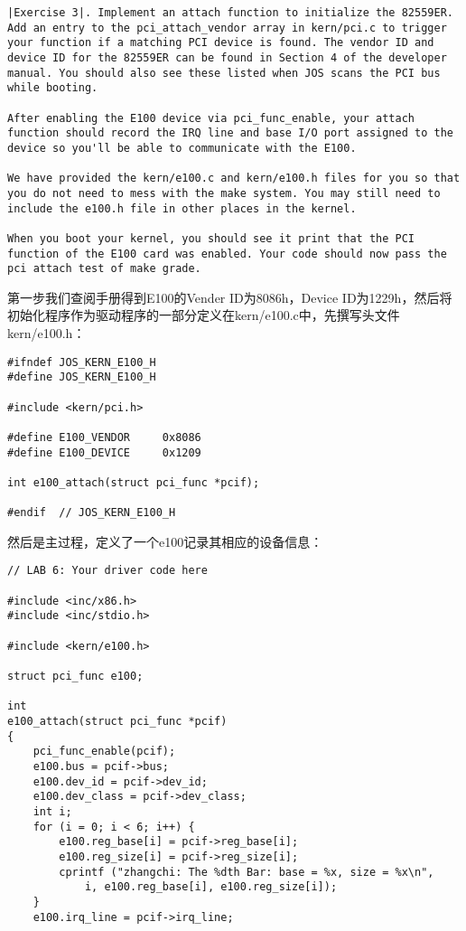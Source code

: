 \documentclass{article}
\begin{document}
\begin{CJK*}{UTF8}{gkai}
\begin{lstlisting}[style=exercise]
|Exercise 3|. Implement an attach function to initialize the 82559ER. Add an entry to the pci_attach_vendor array in kern/pci.c to trigger your function if a matching PCI device is found. The vendor ID and device ID for the 82559ER can be found in Section 4 of the developer manual. You should also see these listed when JOS scans the PCI bus while booting.

After enabling the E100 device via pci_func_enable, your attach function should record the IRQ line and base I/O port assigned to the device so you'll be able to communicate with the E100.

We have provided the kern/e100.c and kern/e100.h files for you so that you do not need to mess with the make system. You may still need to include the e100.h file in other places in the kernel.

When you boot your kernel, you should see it print that the PCI function of the E100 card was enabled. Your code should now pass the pci attach test of make grade.
\end{lstlisting}

第一步我们查阅手册得到E100的Vender ID为8086h，Device ID为1229h，然后将初始化程序作为驱动程序的一部分定义在kern/e100.c中，先撰写头文件kern/e100.h：

\begin{lstlisting}[style=ccode, title={\scriptsize \ttfamily \bfseries kern/e100.h}]
#ifndef JOS_KERN_E100_H
#define JOS_KERN_E100_H

#include <kern/pci.h>

#define E100_VENDOR		0x8086
#define E100_DEVICE		0x1209

int e100_attach(struct pci_func *pcif);

#endif	// JOS_KERN_E100_H
\end{lstlisting}

然后是主过程，定义了一个e100记录其相应的设备信息：

\begin{lstlisting}[style=ccode, title={\scriptsize \ttfamily \bfseries kern/e100.c}]
// LAB 6: Your driver code here

#include <inc/x86.h>
#include <inc/stdio.h>

#include <kern/e100.h>

struct pci_func e100;

int 
e100_attach(struct pci_func *pcif) 
{
    pci_func_enable(pcif);
    e100.bus = pcif->bus;
    e100.dev_id = pcif->dev_id;
    e100.dev_class = pcif->dev_class;
    int i;
    for (i = 0; i < 6; i++) {
    	e100.reg_base[i] = pcif->reg_base[i];
        e100.reg_size[i] = pcif->reg_size[i];
        cprintf ("zhangchi: The %dth Bar: base = %x, size = %x\n", 
            i, e100.reg_base[i], e100.reg_size[i]);
    }
    e100.irq_line = pcif->irq_line;


\end{lstlisting}
\end{CJK*}
\end{document}

